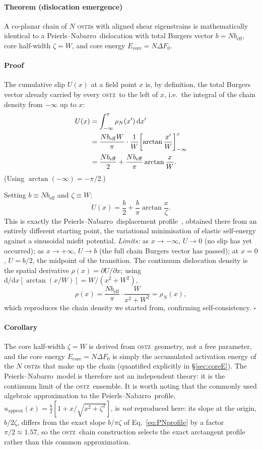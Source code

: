 \documentclass[3p]{elsarticle}
\newcommand{\OSTZ}{\textsc{ostz}}
\newcommand{\dF}{\Delta F_0}
\newcommand{\beff}{b_\mathrm{eff}}
\newcommand{\PN}{Peierls--Nabarro}
\begin{document}
\paragraph{Theorem (dislocation emergence)} A co-planar chain of $N$
\OSTZ s with aligned shear eigenstrains is mathematically identical
to a \PN\ dislocation with total Burgers vector $b=N\beff$, core
half-width $\zeta=W$, and core energy $E_\text{core}=N\dF$.

\paragraph{Proof} The cumulative slip $U(x)$ at a field point $x$ is,
by definition, the total Burgers vector already carried by every
\OSTZ\ to the left of $x$, i.e.\ the integral of the chain density
from $-\infty$ up to $x$:
\begin{align}
  U(x)&=\int_{-\infty}^x\rho_N(x')\,\mathrm dx'\notag\\
  &=\frac{N\beff W}{\pi}\cdot\frac{1}{W}
    \!\left[\arctan\frac{x'}{W}\right]_{-\infty}^x
    \notag\\
  &=\frac{N\beff}{2}+\frac{N\beff}{\pi}\arctan\frac{x}{W}.
  \label{eq:slip}
\end{align}
(Using $\arctan(-\infty)=-\pi/2$.)

Setting $b\equiv N\beff$ and $\zeta\equiv W$:
\begin{equation}
  U(x)=\frac{b}{2}+\frac{b}{\pi}\arctan\frac{x}{\zeta}.
  \label{eq:PNprofile}
\end{equation}
This is exactly the \PN\ displacement profile~\citep{peierls1940,nabarro1947},
obtained there from an entirely different starting point, the
variational minimisation of elastic self-energy against a sinusoidal
misfit potential. \textit{Limits:} as $x\to-\infty$, $U\to0$ (no slip
has yet occurred); as $x\to+\infty$, $U\to b$ (the full chain
Burgers vector has passed); at $x=0$, $U=b/2$, the midpoint of the
transition. The continuum dislocation density is the spatial
derivative $\rho(x)=\partial U/\partial x$; using
$\mathrm d/\mathrm dx[\arctan(x/W)]=W/(x^2+W^2)$,
\[
  \rho(x)=\frac{N\beff}{\pi}\cdot\frac{W}{x^2+W^2}=\rho_N(x),
\]
which reproduces the chain density we started from, confirming
self-consistency. $\square$

\paragraph{Corollary} The core half-width $\zeta=W$ is derived from
\OSTZ\ geometry, not a free parameter, and the core energy
$E_\text{core}=N\dF$ is simply the accumulated activation energy of
the $N$ \OSTZ s that make up the chain (quantified explicitly in
\S\ref{sec:coreE}). The \PN\ model is therefore not an independent
theory: it is the continuum limit of the \OSTZ\ ensemble. It is
worth noting that the commonly used algebraic approximation to the
\PN\ profile, $u_\text{approx}(x)=\tfrac{b}{2}[1+x/\sqrt{x^2+\zeta^2}]$,
is \emph{not} reproduced here: its slope at the origin,
$b/2\zeta$, differs from the exact slope $b/\pi\zeta$ of
Eq.~\eqref{eq:PNprofile} by a factor $\pi/2\approx1.57$, so the
\OSTZ\ chain construction selects the exact arctangent profile
rather than this common approximation.
\end{document}
